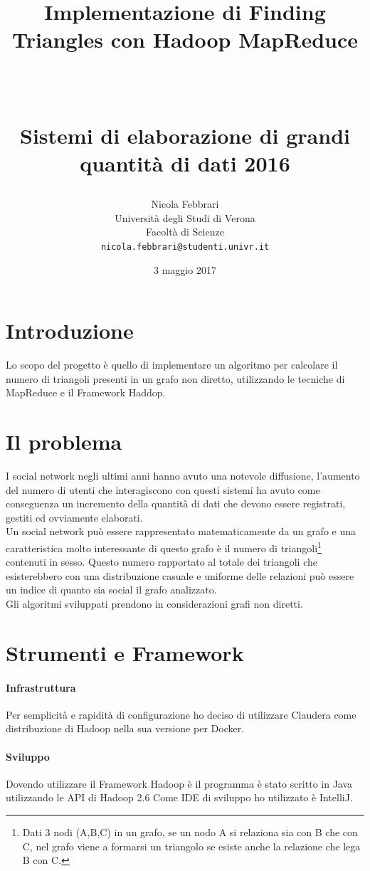 \documentclass[paper=a4, fontsize=11pt]{scrartcl}	%
\title{ \vspace{-1in} 	\usefont{OT1}{bch}{b}{n}
		\huge \strut Implementazione di Finding Triangles con Hadoop MapReduce\strut \\
		\Large \bfseries \strut Sistemi di elaborazione di grandi quantità di dati 2016 \strut
}
\author{ 									\usefont{OT1}{bch}{m}{n}
        Nicola Febbrari\\		\usefont{OT1}{bch}{m}{n}
        Università degli Studi di Verona\\	\usefont{OT1}{bch}{m}{n}
        Facoltà di Scienze\\
        \texttt{nicola.febbrari@studenti.univr.it}
}
\date{3 maggio 2017}
\numberwithin{equation}{section}															%
\numberwithin{figure}{section}																%
\numberwithin{table}{section}																%
\begin{document}
\maketitle
\section{Introduzione}
Lo scopo del progetto è quello di implementare un algoritmo per calcolare il numero di triangoli presenti in un grafo non diretto, utilizzando le tecniche di MapReduce e il Framework Haddop.


\section{Il problema}
I social network negli ultimi anni hanno avuto una notevole diffusione, l'aumento del numero di utenti che interagiscono con questi sistemi ha avuto come conseguenza un  incremento della quantità di dati che devono essere registrati, gestiti ed ovviamente elaborati.\\
Un social network può essere rappresentato matematicamente da un grafo e una caratteristica molto interessante di questo grafo è il numero di triangoli\footnote{Dati 3 nodi (A,B,C) in un grafo, se un nodo A si relaziona sia con B che con C, nel grafo viene a formarsi un triangolo se esiste anche la relazione che lega B con C.} 
contenuti in sesso. Questo numero rapportato al totale dei triangoli che esisterebbero con una distribuzione casuale e uniforme delle relazioni può essere un indice di quanto sia social il grafo analizzato.\\
Gli algoritmi sviluppati prendono in considerazioni grafi non diretti.\\
\section{Strumenti e Framework}
\paragraph{Infrastruttura}
Per semplicità e rapidità di configurazione ho deciso di utilizzare Claudera come distribuzione di Hadoop nella sua versione per Docker.
\paragraph{Sviluppo}
Dovendo utilizzare il Framework Hadoop è il programma è stato scritto in Java utilizzando le API di Hadoop 2.6 Come IDE di sviluppo ho utilizzato è IntelliJ.  
\end{document}
